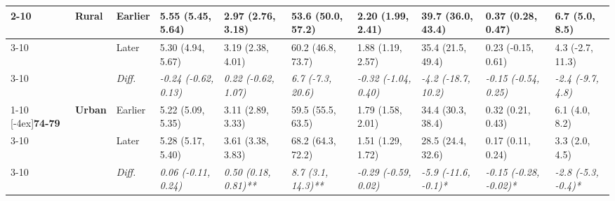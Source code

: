 \documentclass[12pt, a4paper]{article}
\begin{document}
\begin{appendices}
\begin{table}[!p]
{\begin{tabular}[t]{>{}l>{}lllllllll}
        \cmidrule{2-10}
                                              & \multirow{3}{*}{\textbf{Rural}} & Earlier                       & 5.55 (5.45, 5.64)                           & 2.97 (2.76, 3.18)                            & 53.6 (50.0, 57.2)                           & 2.20 (1.99, 2.41)                             & 39.7 (36.0, 43.4)                             & 0.37 (0.28, 0.47)                               & 6.7 (5.0, 8.5)                                \\
        \cmidrule{3-10}
                                              &                                 & Later                         & 5.30 (4.94, 5.67)                           & 3.19 (2.38, 4.01)                            & 60.2 (46.8, 73.7)                           & 1.88 (1.19, 2.57)                             & 35.4 (21.5, 49.4)                             & 0.23 (-0.15, 0.61)                              & 4.3 (-2.7, 11.3)                              \\
        \cmidrule{3-10}
                                              &                                 & \cellcolor{gray!10}\em{Diff.} & \cellcolor{gray!10}\em{-0.24 (-0.62, 0.13)} & \cellcolor{gray!10}\em{0.22 (-0.62, 1.07)}   & \cellcolor{gray!10}\em{6.7 (-7.3, 20.6)}    & \cellcolor{gray!10}\em{-0.32 (-1.04, 0.40)}   & \cellcolor{gray!10}\em{-4.2 (-18.7, 10.2)}    & \cellcolor{gray!10}\em{-0.15 (-0.54, 0.25)}     & \cellcolor{gray!10}\em{-2.4 (-9.7, 4.8)}      \\
        \cmidrule{1-10}
        \multirow{9}{*}[-4ex]{\textbf{74-79}} & \multirow{3}{*}{\textbf{Urban}} & Earlier                       & 5.22 (5.09, 5.35)                           & 3.11 (2.89, 3.33)                            & 59.5 (55.5, 63.5)                           & 1.79 (1.58, 2.01)                             & 34.4 (30.3, 38.4)                             & 0.32 (0.21, 0.43)                               & 6.1 (4.0, 8.2)                                \\
        \cmidrule{3-10}
                                              &                                 & Later                         & 5.28 (5.17, 5.40)                           & 3.61 (3.38, 3.83)                            & 68.2 (64.3, 72.2)                           & 1.51 (1.29, 1.72)                             & 28.5 (24.4, 32.6)                             & 0.17 (0.11, 0.24)                               & 3.3 (2.0, 4.5)                                \\
        \cmidrule{3-10}
                                              &                                 & \cellcolor{gray!10}\em{Diff.} & \cellcolor{gray!10}\em{0.06 (-0.11, 0.24)}  & \cellcolor{gray!10}\em{0.50 (0.18, 0.81)**}  & \cellcolor{gray!10}\em{8.7 (3.1, 14.3)**}   & \cellcolor{gray!10}\em{-0.29 (-0.59, 0.02)}   & \cellcolor{gray!10}\em{-5.9 (-11.6, -0.1)*}   & \cellcolor{gray!10}\em{-0.15 (-0.28, -0.02)*}   & \cellcolor{gray!10}\em{-2.8 (-5.3, -0.4)*}    \\

\end{tabular}}
\end{table}
\end{appendices}
\end{document}
